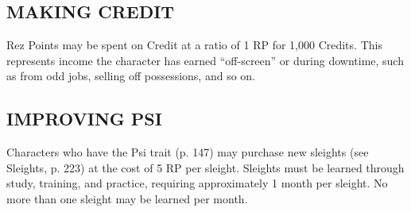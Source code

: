 \subsection{MAKING CREDIT}
Rez Points may be spent on Credit at a ratio of 1 RP for 1,000 Credits. This
represents income the character has earned “off-screen” or during downtime,
such as from odd jobs, selling off possessions, and so on.

\subsection{IMPROVING PSI}
Characters who have the Psi trait (p. 147) may purchase new sleights (see
Sleights, p.  223) at the cost of 5 RP per sleight. Sleights must be learned
through study, training, and practice, requiring approximately 1 month per
sleight. No more than one sleight may be learned per month.


